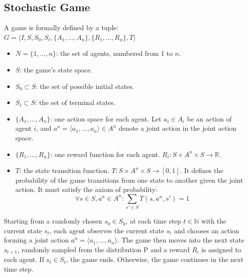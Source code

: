 \documentclass[]{interact}
\theoremstyle{plain}%
\theoremstyle{definition}
\theoremstyle{remark}
\begin{document}
\subsection{Stochastic Game}
A game is formally defined by a tuple:
$G = \langle I,S,S_0,S_t,\{A_1,\ldots,A_n\},\{R_1,\ldots,R_n\},T \rangle$
\begin{itemize}
    \item $N = \{1, ..., n\}$: the set of agents, numbered from 1 to $n$.
    \item $S$: the game’s state space.
    \item $S_0 \subset S$: the set of possible initial states.
    \item $S_t \subset S$: the set of terminal states.
    \item $\{A_1,\ldots,A_n\}$: one action space for each agent. Let $a_i \in A_i$ be an action of agent $i$, and $a^n=\langle a_1,\ldots,a_n \rangle \in A^n$ denote a joint action in the joint action space.
    \item $\{R_1,\ldots,R_n\}$: one reward function for each agent. $R_i:S \times A^n \times S \rightarrow \mathbb{R}$.
    \item $T$: the state transition function. $T:S \times A^n \times S \rightarrow [0,1]$. It defines the probability of the game transitions from one state to another given the joint action. It must satisfy the axiom of probability:
    \begin{equation}
        \forall s \in S,a^n \in A^n: \sum_{s' \in S}{T(s,a^n,s')}=1
        \label{eq:state_transition}
    \end{equation}
\end{itemize}
Starting from a randomly chosen $s_0 \in S_0$, at each time step $t \in \mathbb{N}$ with the current state $s_t$, each agent observes the current state $s_t$ and chooses an action forming a joint action $a^n=\langle a_1,\ldots,a_n \rangle$. The game then moves into the next state $s_{t+1}$, randomly sampled from the distribution P and a reward $R_i$ is assigned to each agent. If $s_t \in S_t$, the game ends. Otherwise, the game continues in the next time step.
\end{document}

